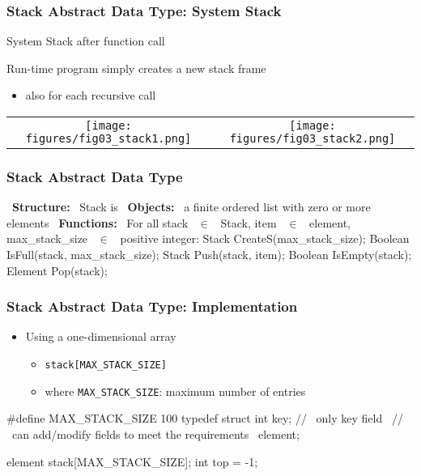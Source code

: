 \documentclass[newPxFont,sthlmFooter,nooffset]{beamer}
\begin{document}
\begin{frame}[t]
  \frametitle{Stack Abstract Data Type: System Stack}
System Stack after function call

{ Run-time program simply creates a new stack frame
  \begin{itemize}
  \item also for each recursive call
  \end{itemize}
}

  \begin{center}
    \begin{tabular}{!{}c<{}c}
      \texttt{[image: figures/fig03\_stack1.png]} &
      \texttt{[image: figures/fig03\_stack2.png]} \\
    \end{tabular}
  \end{center}

\end{frame}


\begin{frame}[t,fragile]
  \frametitle{Stack Abstract Data Type}
\begin{codedef}
~\textbf{Structure:}~    Stack is 
   ~\textbf{Objects:}~ a finite ordered list with zero or more elements
   ~\textbf{Functions:}~
   For all stack ~$\in$~ Stack, 
   item ~$\in$~ element,
   max_stack_size ~$\in$~ positive integer:
       Stack CreateS(max_stack_size);
       Boolean IsFull(stack, max_stack_size);
       Stack Push(stack, item);
       Boolean IsEmpty(stack);
       Element Pop(stack); 
\end{codedef}
\end{frame}


\begin{frame}[t, fragile]
  \frametitle{Stack Abstract Data Type: Implementation}
  \begin{itemize}
  \item Using a one-dimensional array
    \begin{itemize}
    \item \texttt{stack[MAX\_STACK\_SIZE]}
    \item where \texttt{MAX\_STACK\_SIZE}: maximum number of entries
    \end{itemize}
  \end{itemize}
\begin{ncodedef}
#define MAX_STACK_SIZE  100
typedef struct {
    int key; // ~only key field~
             // ~can add/modify fields to meet the requirements~
} element;

element stack[MAX_STACK_SIZE];
int top = -1;
\end{ncodedef}
\end{frame}
\end{document}
